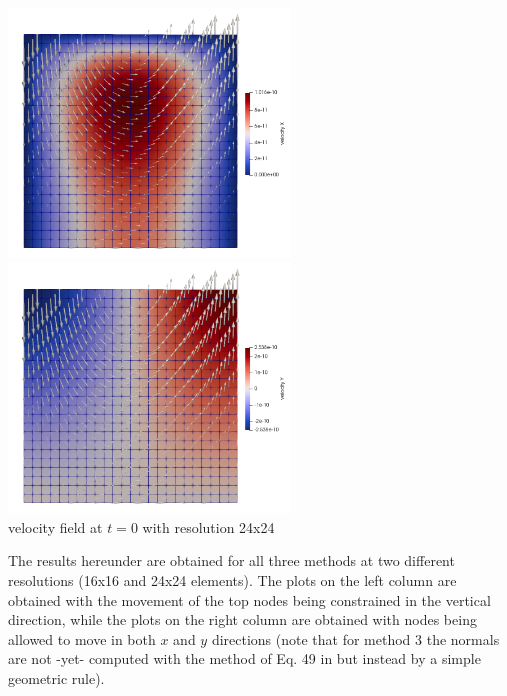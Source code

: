 \begin{center}
\includegraphics[width=7.5cm]{python_codes/fieldstone_54/images/exp1/u}
\includegraphics[width=7.5cm]{python_codes/fieldstone_54/images/exp1/v}\\
{\captionfont velocity field at $t=0$ with resolution 24x24}
\end{center}

The results hereunder are obtained for all three methods at two different resolutions (16x16 
and 24x24 elements).
The plots on the left column are obtained with the movement of the top nodes being constrained in 
the vertical direction, while the plots on the right column are obtained with nodes being 
allowed to move in both $x$ and $y$ directions (note that for method 3 the normals are not -yet-
computed with the method of Eq. 49 in \cite{robh17} but instead by a simple geometric rule).

